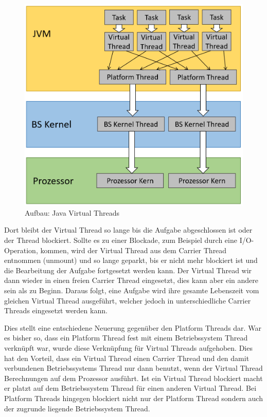 \documentclass[fontsize=12pt,paper=a4,twoside=semi,parskip=half-,headsepline,headinclude]{scrreprt}
\begin{document}
\begin{figure}[h]
	\centering
	\includegraphics[scale=0.5]{figures/VirtualThreads.png}
	\caption{Aufbau: Java Virtual Threads}
	\label{fig:VirtualThreads}
\end{figure}

Dort bleibt der Virtual Thread so lange bis die Aufgabe abgeschlossen ist oder der Thread blockiert. Sollte es zu einer Blockade, zum Beispiel durch eine I/O-Operation, kommen, wird der Virtual Thread aus dem Carrier Thread entnommen (unmount) und so lange geparkt, bis er nicht mehr blockiert ist und die Bearbeitung der Aufgabe fortgesetzt werden kann. Der Virtual Thread wir dann wieder in einen freien Carrier Thread eingesetzt, dies kann aber ein andere sein als zu Beginn. Daraus folgt, eine Aufgabe wird ihre gesamte Lebenszeit vom gleichen Virtual Thread ausgeführt, welcher jedoch in unterschiedliche Carrier Threads eingesetzt werden kann. 

Dies stellt eine entschiedene Neuerung gegenüber den Platform Threads dar. War es bisher so, dass ein Platform Thread fest mit einem Betriebssystem Thread verknüpft war, wurde diese Verknüpfung für Virtual Threads aufgehoben. Dies hat den Vorteil, dass ein Virtual Thread einen Carrier Thread und den damit verbundenen Betriebssystems Thread nur dann benutzt, wenn der Virtual Thread Berechnungen auf dem Prozessor ausführt. Ist ein Virtual Thread blockiert macht er platzt auf dem Betriebssystem Thread für einen anderen Virtual Thread. Bei Platform Threads hingegen blockiert nicht nur der Platform Thread sondern auch der zugrunde liegende Betriebssystem Thread. \cite{Bateman2023}
\end{document}
